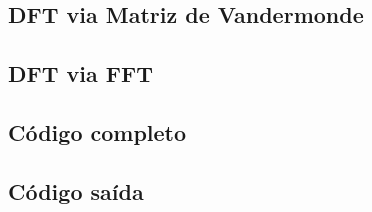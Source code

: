 \documentclass[12pt]{article}
\begin{document}
\subsection{DFT via Matriz de Vandermonde}



\subsection{DFT via FFT}



\newpage
\subsection{Código completo}


\subsection{Código saída}

\end{document}
